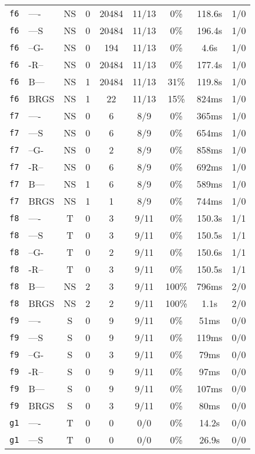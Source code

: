 \begin{tabular}{llccccccc}
\texttt{f6} & ---- & NS & 0 & 20484 & 11/13 & 0\% & 118.6s & 1/0 \\
\texttt{f6} & ---S & NS & 0 & 20484 & 11/13 & 0\% & 196.4s & 1/0 \\
\texttt{f6} & --G- & NS & 0 & 194 & 11/13 & 0\% & 4.6s & 1/0 \\
\texttt{f6} & -R-- & NS & 0 & 20484 & 11/13 & 0\% & 177.4s & 1/0 \\
\texttt{f6} & B--- & NS & 1 & 20484 & 11/13 & 31\% & 119.8s & 1/0 \\
\texttt{f6} & BRGS & NS & 1 & 22 & 11/13 & 15\% & 824ms & 1/0 \\
\texttt{f7} & ---- & NS & 0 & 6 & 8/9 & 0\% & 365ms & 1/0 \\
\texttt{f7} & ---S & NS & 0 & 6 & 8/9 & 0\% & 654ms & 1/0 \\
\texttt{f7} & --G- & NS & 0 & 2 & 8/9 & 0\% & 858ms & 1/0 \\
\texttt{f7} & -R-- & NS & 0 & 6 & 8/9 & 0\% & 692ms & 1/0 \\
\texttt{f7} & B--- & NS & 1 & 6 & 8/9 & 0\% & 589ms & 1/0 \\
\texttt{f7} & BRGS & NS & 1 & 1 & 8/9 & 0\% & 744ms & 1/0 \\
\texttt{f8} & ---- & T & 0 & 3 & 9/11 & 0\% & 150.3s & 1/1 \\
\texttt{f8} & ---S & T & 0 & 3 & 9/11 & 0\% & 150.5s & 1/1 \\
\texttt{f8} & --G- & T & 0 & 2 & 9/11 & 0\% & 150.6s & 1/1 \\
\texttt{f8} & -R-- & T & 0 & 3 & 9/11 & 0\% & 150.5s & 1/1 \\
\texttt{f8} & B--- & NS & 2 & 3 & 9/11 & 100\% & 796ms & 2/0 \\
\texttt{f8} & BRGS & NS & 2 & 2 & 9/11 & 100\% & 1.1s & 2/0 \\
\texttt{f9} & ---- & S & 0 & 9 & 9/11 & 0\% & 51ms & 0/0 \\
\texttt{f9} & ---S & S & 0 & 9 & 9/11 & 0\% & 119ms & 0/0 \\
\texttt{f9} & --G- & S & 0 & 3 & 9/11 & 0\% & 79ms & 0/0 \\
\texttt{f9} & -R-- & S & 0 & 9 & 9/11 & 0\% & 97ms & 0/0 \\
\texttt{f9} & B--- & S & 0 & 9 & 9/11 & 0\% & 107ms & 0/0 \\
\texttt{f9} & BRGS & S & 0 & 3 & 9/11 & 0\% & 80ms & 0/0 \\
\texttt{g1} & ---- & T & 0 & 0 & 0/0 & 0\% & 14.2s & 0/0 \\
\texttt{g1} & ---S & T & 0 & 0 & 0/0 & 0\% & 26.9s & 0/0 \\

\end{tabular}
